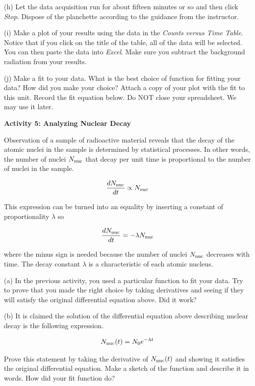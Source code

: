(h) Let the data acquisition run for about fifteen minutes or so and then click \textit{Stop}.
Dispose of the planchette according to the guidance from the instructor.

(i) Make a plot of your results using the data in the {\it Counts versus Time Table}. 
Notice that if you 
click on the title of the table, all of the
data will be selected. You can then paste the data into {\it Excel}.
Make sure you subtract the background radiation from your results.

(j) Make a fit to your data. What is the best choice of function for fitting 
your data? How did you make your choice?
Attach a copy of your plot with the fit to this unit.
Record the fit equation below.
Do NOT close your spreadsheet. We may use it later.

\vspace{0.5in}

\textbf{Activity 5: Analyzing Nuclear Decay }

Observation of a sample of radioactive material reveals that the decay
of the atomic nuclei in the sample is determined by statistical processes.
In other words, the number of nuclei $N_{\rm nuc}$ that decay per
unit time is proportional to the number of nuclei in the sample.

\[
\frac{dN_{\rm nuc}}{dt}\propto N_{\rm nuc}\]


This expression can be turned into an equality by inserting a constant
of proportionality \( \lambda  \) so

\[
\frac{dN_{\rm nuc}}{dt}=-\lambda N_{\rm nuc}\]


where the minus sign is needed because the number of nuclei $N_{\rm nuc}$
decreases with time. The decay constant \( \lambda  \) is a characteristic
of each atomic nucleus. 

(a) In the previous activity, you used a particular function to fit 
your data.
Try to prove that you made the right choice by taking derivatives and
seeing if they will satisfy the original differential equation above.
Did it work?
\answerspace{30mm}

\pagebreak[2]
(b) It is claimed the solution of the differential equation above
describing nuclear decay is the following expression.

\[
N_{\rm nuc}(t)=N_{0}e^{-\lambda t}\]


Prove this statement by taking the derivative of $N_{\rm nuc}(t)$
and showing it satisfies the original differential equation. Make
a sketch of the function and describe it in words.
How did your fit function do?
\answerspace{40mm}

